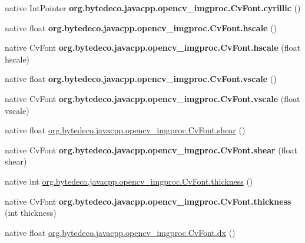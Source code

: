 \begin{DoxyCompactItemize}
\mbox{\label{group__imgproc_gad3612d8aa6ffe768f5a106034bae4f97}} 
native Int\+Pointer {\bfseries org.\+bytedeco.\+javacpp.\+opencv\+\_\+imgproc.\+Cv\+Font.\+cyrillic} ()
\item 
\mbox{\label{group__imgproc_ga7b340ce87544a4d272b8e556fd334ff0}} 
native float {\bfseries org.\+bytedeco.\+javacpp.\+opencv\+\_\+imgproc.\+Cv\+Font.\+hscale} ()
\item 
\mbox{\label{group__imgproc_gac08c92ed483fabf682df81f627403670}} 
native Cv\+Font {\bfseries org.\+bytedeco.\+javacpp.\+opencv\+\_\+imgproc.\+Cv\+Font.\+hscale} (float hscale)
\item 
\mbox{\label{group__imgproc_gabfcea1595a06b8f823538d313622379d}} 
native float {\bfseries org.\+bytedeco.\+javacpp.\+opencv\+\_\+imgproc.\+Cv\+Font.\+vscale} ()
\item 
\mbox{\label{group__imgproc_ga02b1403f770c7431187afdc32d2712e3}} 
native Cv\+Font {\bfseries org.\+bytedeco.\+javacpp.\+opencv\+\_\+imgproc.\+Cv\+Font.\+vscale} (float vscale)
\item 
native float \hyperlink{group__imgproc_ga73ceb8658b15dd4f640dae5c1ad07ac7}{org.\+bytedeco.\+javacpp.\+opencv\+\_\+imgproc.\+Cv\+Font.\+shear} ()
\item 
\mbox{\label{group__imgproc_gaed0027ae6a85378a101806b8255fb6b7}} 
native Cv\+Font {\bfseries org.\+bytedeco.\+javacpp.\+opencv\+\_\+imgproc.\+Cv\+Font.\+shear} (float shear)
\item 
native int \hyperlink{group__imgproc_ga598e4433b73866dbddf63fed41e2a5ed}{org.\+bytedeco.\+javacpp.\+opencv\+\_\+imgproc.\+Cv\+Font.\+thickness} ()
\item 
\mbox{\label{group__imgproc_gae3c8805f72bc0de310f52433402738ba}} 
native Cv\+Font {\bfseries org.\+bytedeco.\+javacpp.\+opencv\+\_\+imgproc.\+Cv\+Font.\+thickness} (int thickness)
\item 
native float \hyperlink{group__imgproc_ga294de5433e3cdf5192b9c2fd48520538}{org.\+bytedeco.\+javacpp.\+opencv\+\_\+imgproc.\+Cv\+Font.\+dx} ()
\item 
\mbox{\label{group__imgproc_gaa18cd498b852bdbaf3f05c3246529a16}} 

\end{DoxyCompactItemize}
